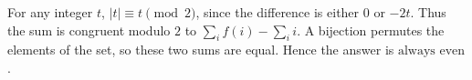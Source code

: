 For any integer $t$, $|t|\equiv t\pmod 2$, since the difference is either $0$ or $-2t$. Thus the sum is congruent modulo $2$ to $\sum_i f(i)-\sum_i i$. A bijection permutes the elements of the set, so these two sums are equal. Hence the answer is $\boxed{\text{always even}}$.
